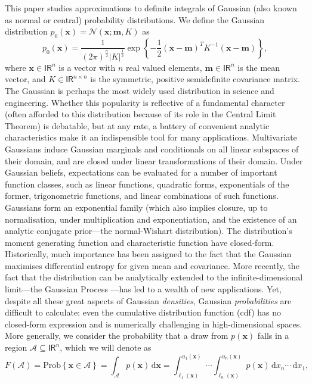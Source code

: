 \documentclass[twoside,11pt]{article}
\def\x{{\mathbf x}}
\def\m{{\mathbf m}}
\def\regionA{\mathcal{A}}
\newcommand{\reals}{\mathsf{I\!R}}
\newcommand{\N}{\mathcal{N}}
\renewcommand{\d}{\,\mathrm{d}}
\begin{document}
This paper studies approximations to definite integrals of Gaussian (also known as normal or central) probability distributions. We define the Gaussian distribution $p_0(\x) = \N(\x;\m,K)$ as
%
\begin{equation} 
\label{eqn:gaussian} 
p_0(\x) =  \frac{1}{(2\pi)^{\frac{n}{2}}|K|^{\frac{1}{2}}} \exp\left\{ -\frac{1}{2}(\x - \m)^T K^{-1}(\x - \m)\right\}, \end{equation}
%
\noindent where $\x\in\reals^{n}$ is a vector with $n$ real valued elements, $\m\in\reals^{n}$ is the mean vector, and $K\in\reals^{n\times n}$ is the symmetric, positive semidefinite covariance matrix. The Gaussian is perhaps the most widely used distribution in science and engineering. Whether this popularity is reflective of a fundamental character (often afforded to this distribution because of its role in the Central Limit Theorem) is debatable, but at any rate, a battery of convenient analytic characteristics make it an indispensible tool for many applications.   Multivariate Gaussians induce Gaussian marginals and conditionals on all linear subspaces of their domain, and are closed under linear transformations of their domain. Under Gaussian beliefs, expectations can be evaluated for a number of important function classes, such as linear functions, quadratic forms, exponentials of the former, trigonometric functions, and linear combinations of such functions. Gaussians form an exponential family (which also implies closure, up to normalisation, under multiplication and exponentiation, and the existence of an analytic conjugate prior---the normal-Wishart distribution). The distribution's moment generating function and characteristic function have closed-form. Historically, much importance has been assigned to the fact that the Gaussian maximises differential entropy for given mean and covariance. More recently, the fact that the distribution can be analytically extended to the infinite-dimensional limit---the Gaussian Process \citep{rasmussenBook}---has led to a wealth of new applications. Yet, despite all these great aspects of Gaussian \emph{densities}, Gaussian \emph{probabilities} are difficult to calculate: even the cumulative distribution function (cdf) has no closed-form expression and is numerically challenging in high-dimensional spaces. More generally, we consider the probability that a draw from $p(\x)$ falls in a region $\regionA\subseteq\reals^{n}$, which we will denote as
\begin{equation}
\label{eqn:cumdensity}
F(\regionA) = \mathrm{Prob}\left\{\x\in \regionA\right\} = \int_\regionA p(\x)\d\x =
\int_{\ell_1(\x)}^{u_1(\x)} \cdots \int_{\ell_n(\x)}^{u_n(\x)} p(\x) \d
x_n \cdots \d x_1,
\end{equation}
\end{document}
